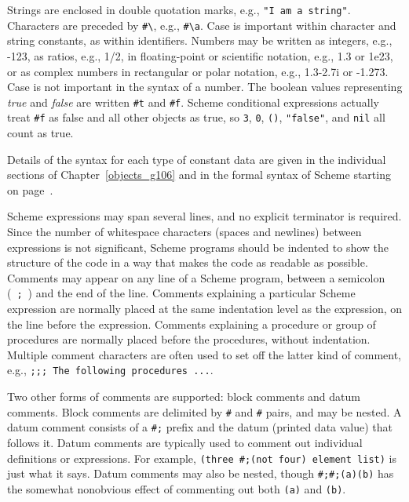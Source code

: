 Strings are enclosed in double quotation marks, e.g.,
\texttt{"I am a string"}.
Characters are preceded by \texttt{\#{}\textbackslash{}}, e.g., \texttt{\#{}\textbackslash{}a}.
Case is important within character and string constants, as within
identifiers.
Numbers may be written as integers, e.g., -123, as ratios, e.g., 1/2,
in floating-point or scientific notation,
e.g., 1.3 or 1e23, or as complex numbers in rectangular or polar
notation, e.g., 1.3-2.7i or -1.2\@{}73.
Case is not important in the syntax of a number.
The \label{intro_s35}boolean values representing \label{intro_s36}\textit{true} and \label{intro_s37}\textit{false}
are written \label{intro_s38}\texttt{\#{}t} and \label{intro_s39}\texttt{\#{}f}.
Scheme conditional expressions actually treat \texttt{\#{}f} as false and all
other objects as true, so
\texttt{3}, \texttt{0}, \texttt{()}, \texttt{"false"}, and \texttt{nil} all count as true.


Details of the syntax for each type 
of constant data are given in the individual
sections of Chapter \ref{objects_g106} and in the formal syntax of
Scheme starting on page \pageref{grammar_APPENDIXFORMALSYNTAX}.


Scheme \label{intro_s40}expressions may span several lines, and no explicit
terminator is required.
Since the number of \label{intro_s41}whitespace characters (spaces and newlines)
between expressions is not
significant, Scheme programs should be indented to show the structure
of the code in a way that makes the code as readable as possible.
\label{intro_s42}Comments may appear on any line of a Scheme program, between
a \label{intro_s43}\label{intro_s44}semicolon ( \texttt{;} ) and the end of the line.
Comments explaining a particular Scheme expression are normally placed
at the same indentation level as the expression, on the line before
the expression.
Comments explaining a procedure or group of procedures are normally
placed before the procedures, without indentation.
Multiple comment characters are often used to set off the latter kind of
comment, e.g., \texttt{;;; The following procedures ...}.


Two other forms of comments are supported: block comments and datum comments.
Block comments are delimited by \texttt{\#{}\textbar{}} and \texttt{\textbar{}\#{}} pairs, and may be
nested.
A datum comment consists of a \texttt{\#{};} prefix and the datum (printed data value)
that follows it.
Datum comments are typically used to comment out individual definitions
or expressions.
For example, \texttt{(three \#{};(not four) element list)} is just what it says.
Datum comments may also be nested, though \texttt{\#{};\#{};(a)(b)} has the
somewhat nonobvious effect of commenting out both \texttt{(a)} and
\texttt{(b)}.



